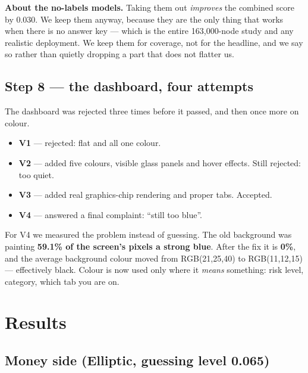 \documentclass[11pt,a4paper]{article}
\begin{document}
\textbf{About the no-labels models.} Taking them out \emph{improves} the combined
score by 0.030. We keep them anyway, because they are the only thing that works
when there is no answer key --- which is the entire 163{,}000-node study and any
realistic deployment. We keep them for coverage, not for the headline, and we say
so rather than quietly dropping a part that does not flatter us.

\subsection{Step 8 --- the dashboard, four attempts}

The dashboard was rejected three times before it passed, and then once more on
colour.

\begin{itemize}
  \item \textbf{V1} --- rejected: flat and all one colour.
  \item \textbf{V2} --- added five colours, visible glass panels and hover effects.
        Still rejected: too quiet.
  \item \textbf{V3} --- added real graphics-chip rendering and proper tabs.
        Accepted.
  \item \textbf{V4} --- answered a final complaint: ``still too blue''.
\end{itemize}

For V4 we measured the problem instead of guessing. The old background was
painting \textbf{59.1\% of the screen's pixels a strong blue}. After the fix it is
\textbf{0\%}, and the average background colour moved from RGB(21,25,40) to
RGB(11,12,15) --- effectively black. Colour is now used only where it \emph{means}
something: risk level, category, which tab you are on.

\section{Results}
\label{sec:results}

\subsection{Money side (Elliptic, guessing level 0.065)}
\end{document}
